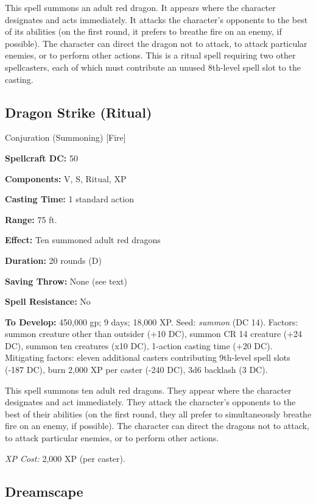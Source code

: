 \documentclass{article}
\begin{document}
This spell summons an adult red dragon. It appears where the character designates 
and acts immediately. It attacks the character's opponents to the best of its abilities 
(on the first round, it prefers to breathe fire on an enemy, if possible). The 
character can direct the dragon not to attack, to attack particular enemies, or 
to perform other actions. This is a ritual spell requiring two other spellcasters, 
each of which must contribute an unused 8th-level spell slot to the casting. 

\vspace{12pt}
\subsection*{Dragon Strike (Ritual)}

Conjuration (Summoning) [Fire] 

\textbf{Spellcraft DC:} 50 

\textbf{Components:} V, S, Ritual, XP 

\textbf{Casting Time:} 1 standard action 

\textbf{Range:} 75 ft. 

\textbf{Effect:} Ten summoned adult red dragons 

\textbf{Duration:} 20 rounds (D) 

\textbf{Saving Throw:} None (see text) 

\textbf{Spell Resistance:} No 

\textbf{To Develop:} 450,000 gp; 9 days; 18,000 XP. Seed: \textit{summon }(DC 14). 
Factors: summon creature other than outsider (+10 DC), summon CR 14 creature (+24 
DC), summon ten creatures (x10 DC), 1-action casting time (+20 DC). Mitigating 
factors: eleven additional casters contributing 9th-level spell slots (-187 DC), 
burn 2,000 XP per caster (-240 DC), 3d6 backlash (\-{}3 DC). 

This spell summons ten adult red dragons. They appear where the character designates 
and act immediately. They attack the character's opponents to the best of their 
abilities (on the first round, they all prefer to simultaneously breathe fire on 
an enemy, if possible). The character can direct the dragons not to attack, to 
attack particular enemies, or to perform other actions. 

\textit{XP Cost: }2,000 XP (per caster). 

\vspace{12pt}
\subsection*{Dreamscape }
\end{document}
